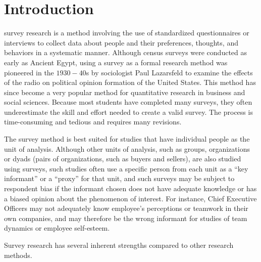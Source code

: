 \section{Introduction}

\Gls{survey} research is a method involving the use of standardized questionnaires or interviews to collect data about people and their preferences, thoughts, and behaviors in a systematic manner. Although census surveys were conducted as early as Ancient Egypt, using a survey as a formal research method was pioneered in the $ 1930-40 $s by sociologist Paul Lazarsfeld to examine the effects of the radio on political opinion formation of the United States. This method has since become a very popular method for quantitative research in business and social sciences. Because most students have completed many surveys, they often underestimate the skill and effort needed to create a valid survey. The process is time-consuming and tedious and requires many revisions.

The survey method is best suited for studies that have individual people as the unit of analysis. Although other units of analysis, such as groups, organizations or dyads (pairs of organizations, such as buyers and sellers), are also studied using surveys, such studies often use a specific person from each unit as a ``key informant'' or a ``proxy'' for that unit, and such surveys may be subject to respondent \gls{bias} if the informant chosen does not have adequate knowledge or has a biased opinion about the phenomenon of interest. For instance, Chief Executive Officers may not adequately know employee's perceptions or teamwork in their own companies, and may therefore be the wrong informant for studies of team dynamics or employee self-esteem.

Survey research has several inherent strengths compared to other research methods. 

